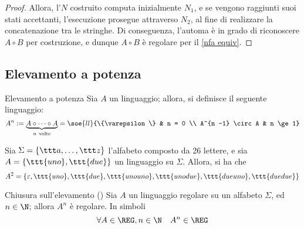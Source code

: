 \documentclass[a4paper, 12pt]{report}
\begin{document}
\begin{proof}

        Allora, l'\NFA $N$ costruito computa inizialmente $N_1$, e se vengono raggiunti suoi stati accettanti, l'esecuzione prosegue attraverso $N_2$, al fine di realizzare la concatenazione tra le stringhe. Di conseguenza, l'automa è in grado di riconoscere $A \circ B$ per costruzione, e dunque $A \circ B$ è regolare per il \cref{nfa equiv}.
    \end{proof}

    \subsection{Elevamento a potenza}

    \begin{frameddefn}{Elevamento a potenza}
        Sia $A$ un linguaggio; allora, si definisce  il seguente linguaggio: $$A^n := \underbrace{A \circ \cdots \circ A}_{n \ \textrm{volte}} = \soe{ll}{\{\varepsilon \} & n = 0 \\ A^{n -1} \circ A & n \ge 1}$$
    \end{frameddefn}

    \begin{example}
        Sia $\Sigma = \{\ttt a , \ldots, \ttt z\}$ l'alfabeto composto da 26 lettere, e sia $A = \{\ttt{uno}, \ttt{due}\}$ un linguaggio su $\Sigma$. Allora, si ha che $$A^2 = \{\varepsilon, \ttt{uno}, \ttt{due}, \ttt{unouno}, \ttt{unodue}, \ttt{dueuno}, \ttt{duedue}\}$$
    \end{example}

    \begin{framedprop}{Chiusura sull'elevamento (\REG)}
        Sia $A$ un linguaggio regolare su un alfabeto $\Sigma$, ed $n \in \N$; allora $A^n$ è regolare. In simboli $$\forall A \in \REG, n \in \N \quad A^n \in \REG$$
    \end{framedprop}

\end{document}
